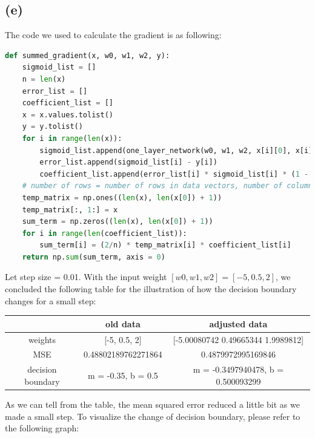 \documentclass[12pt]{article}
\begin{document}
\subsection*{(e)}
The code we used to calculate the gradient is as following: 
\begin{lstlisting}[language=Python, caption=Calculate Gradient]
def summed_gradient(x, w0, w1, w2, y): 
    sigmoid_list = []
    n = len(x)
    error_list = []
    coefficient_list = []
    x = x.values.tolist()
    y = y.tolist()
    for i in range(len(x)): 
        sigmoid_list.append(one_layer_network(w0, w1, w2, x[i][0], x[i][1]))
        error_list.append(sigmoid_list[i] - y[i])
        coefficient_list.append(error_list[i] * sigmoid_list[i] * (1 - sigmoid_list[i]))
    # number of rows = number of rows in data vectors, number of columns = number of columns in data vector + 1 since 1 for bias coefficient
    temp_matrix = np.ones((len(x), len(x[0]) + 1))
    temp_matrix[:, 1:] = x
    sum_term = np.zeros((len(x), len(x[0]) + 1))
    for i in range(len(coefficient_list)):
        sum_term[i] = (2/n) * temp_matrix[i] * coefficient_list[i]
    return np.sum(sum_term, axis = 0)
\end{lstlisting}
Let step size = 0.01. With the input weight $[w0, w1, w2] = [-5, 0.5, 2]$, we concluded the following table for the illustration of how the decision boundary changes for a small step: 
\begin{center}
    \begin{tabular}{| c | c | c |}
        \hline
        & old data & adjusted data\\
        \hline
        weights & [-5, 0.5, 2] & [-5.00080742  0.49665344  1.9989812] \\
        \hline
        MSE & 0.48802189762271864 & 0.4879972995169846 \\
        \hline
        decision boundary & m = -0.35, b = 0.5 & m = -0.3497940478, b = 0.500093299\\
        \hline
    \end{tabular}
\end{center}
As we can tell from the table, the mean squared error reduced a little bit as we made a small step. To visualize the change of decision boundary, please refer to the following graph: 
\end{document}
